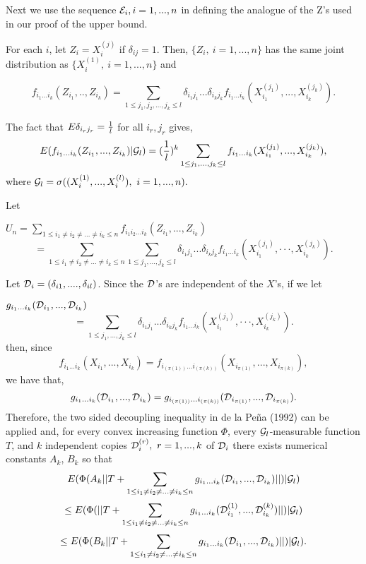 Next we use the sequence ${\cal E}_i, i=1,...,n$ in 
defining the analogue of the Z's  
used in our proof of the upper bound.  

For each $i$, let $Z_i= X_i^{(j)}$ if $\delta_{ij} =1$.
Then, $\{Z_i,~i=1,...,n\}$ has the same joint distribution as
$\{X_i^{(1)},~i=1,...,n\}$ and

$$f_{i_1...i_k}(Z_{i_1},..,Z_{i_k}) =
\sum_{1\le j_1, j_2,...,j_k\le l} \delta_{i_1j_1}...\delta_{i_kj_k}
f_{i_1...i_k}(X_{i_1}^{(j_1)},..., X_{i_k}^{(j_k)}).$$

The fact that $E\delta_{i_rj_r} = {1\over l}$ for all $i_r,j_r$ gives, 
$$E(f_{i_1...i_k}(Z_{i_1},...,Z_{i_k})| {\cal G}_l) =
({1\over l})^k\sum_{1\le j_1,...,j_k \le l} 
f_{i_1...i_k}(X_{i_1}^{(j_1)},...,X_{i_k}^{(j_k)}),$$
where ${\cal G}_l = \sigma ((X_i^{(1)}, ..., X_{i}^{(l)} ), ~i=1,...,n).$ 


\noindent Let

\noindent 
$U_n
=\sum_{1\le i_1\ne i_2 \ne ... \ne i_k \le n} f_{i_1 i_2...i_k} (Z_{i_1},...,
Z_{i_k})$ 
$$
=\sum_{1\le i_1 \ne i_2 \ne ...\ne i_k \le n}\sum_{1\le j_1,...,j_k \le l} 
\delta_{i_1j_1}...\delta_{i_kj_k}
f_{i_1...i_k}(
X_{i_1}^{(j_1)},\cdot \cdot \cdot ,X_{i_k}^{(j_k)}).$$

Let ${\cal D}_i = (\delta_{i1},....,\delta_{il})$.
Since the ${\cal D }$'s are independent of the
$X$'s, if we let 

\noindent
$g_{i_1...i_k}({\bf \cal D}_{i_1},...,{\cal D}_{i_k}) $
$$
=\sum_{1\le j_1,...,j_k \le l} 
\delta_{{i_1}{j_1}}
...\delta_{{i_k}{j_k}} f_{i_1...i_k}(
X_{i_1}^{(j_1)},\cdot \cdot \cdot ,X_{i_k}^{(j_k)}).$$
then, since 
$$f_{i_1...i_k}(X_{i_1},...,X_{i_k})=
f_{i_{(\pi (1))}...i_{(\pi (k))}}(X_{i_{\pi (1)}},...,X_{i_{\pi (k)}}),$$
\noindent we have that,
$$g_{i_1...i_k}({ \cal D}_{i_1},...,{\cal D}_{i_k})=
g_{i_{(\pi (1))}...i_{(\pi (k))}}({\cal D}_{i_{\pi(1)}},...,
{\cal D}_{i_{\pi (k)}}).
$$
Therefore, the two sided decoupling inequality in de la Pe\~na (1992) 
can be applied and, for every convex increasing function $\Phi$,
every ${\cal G}_l$-measurable function $T$,
and $k $ independent copies ${\cal D}_i^{(r)}, ~r=1,...,k$ of 
${\cal D}_i$ there exists numerical constants $A_k$, $B_k$ so that 
$$E (\Phi (A_k||T+\sum_{1\le i_1 \ne i_2 \ne ...\ne i_k \le n}
g_{i_1...i_k}({\cal D}_{i_1},...,{\cal D}_{i_k})||)|{\cal G}_l)$$
$$\le E (\Phi (||T+\sum_{1\le i_1 \ne i_2 \ne ...\ne i_k \le n}
g_{i_1...i_k}({\cal D}_{i_1}^{(1)},...,{\cal D}_{i_k}^{(k)})||)|{\cal G}_l)$$
$$\le E(\Phi (B_k||T+\sum_{1\le i_1 \ne i_2 \ne ...\ne i_k \le n}
g_{i_1...i_k}({\cal D}_{i_1},...,{\cal D}_{i_k})||)|{\cal G}_l).$$

